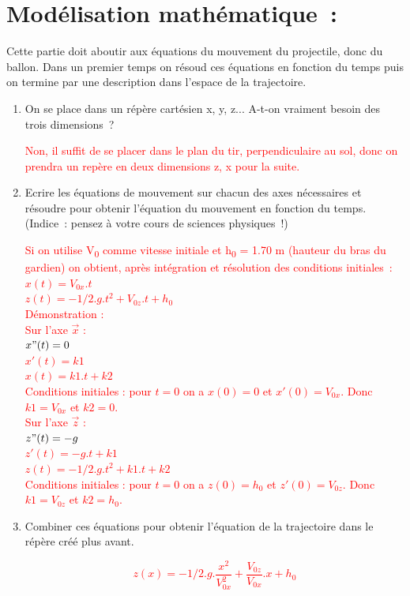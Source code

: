 \documentclass[french,a4paper,10pt]{article}
\begin{document}
\section{Modélisation mathématique :}
Cette partie doit aboutir aux équations du mouvement du projectile, donc du ballon. Dans un premier temps on résoud ces équations en fonction du temps puis on termine par une description dans l'espace de la trajectoire.\\

\begin{enumerate}
    \item On se place dans un répère cartésien x, y, z... A-t-on vraiment besoin des trois dimensions ?\\
\begin{reponse}
\textcolor{red}{Non, il suffit de se placer dans le plan du tir, perpendiculaire au sol, donc on prendra un repère en deux dimensions z, x pour la suite.}
\end{reponse}

    \item Ecrire les équations de mouvement sur chacun des axes nécessaires et résoudre pour obtenir l’équation du mouvement en fonction du temps. (Indice : pensez à votre cours de sciences physiques !)\\
\begin{reponse}
\textcolor{red}{Si on utilise V\textsubscript{0} comme vitesse initiale et h\textsubscript{0} = 1.70 m (hauteur du bras du gardien) on obtient, après intégration et résolution des conditions initiales :\\
$x(t) = V_{0x} . t$\\
$z(t) = - 1/2 . g . t^2 + V_{0z} . t + h_0$\\
Démonstration :\\
Sur l'axe $\vec{x}$ :\\
$x"(t) = 0$\\
$x'(t) = k1$\\
$x(t) = k1 . t + k2$\\
Conditions initiales : pour $t = 0$ on a $x(0) = 0$ et $x'(0) = V_{0x}$. Donc $k1 = V_{0x}$ et $k2 = 0$.\\
Sur l'axe $\vec{z}$ :\\
$z"(t) = -g$\\
$z'(t) = -g . t + k1$\\
$z(t) = - 1/2 . g . t^2 + k1 . t + k2$\\
Conditions initiales : pour $t = 0$ on a $z(0) = h_0$ et $z'(0) = V_{0z}$. Donc $k1 = V_{0z}$ et $k2 = h_0$.}
\end{reponse}

    \item Combiner ces équations pour obtenir l’équation de la trajectoire dans le répère créé plus avant.\\
\begin{reponse}
    \textcolor{red}{$$z(x) = - 1/2 . g . \frac{x^2}{V_{0x}^2} + \frac{V_{0z}}{V_{0x}} . x + h_0$$}
\end{reponse}
\end{enumerate}
\end{document}
